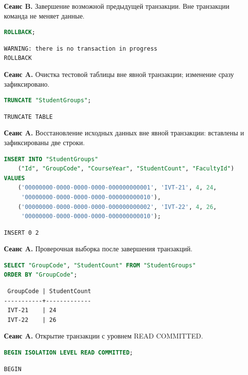 \documentclass[12pt,a4paper]{article}
\begin{document}
\textbf{Сеанс B.} Завершение возможной предыдущей транзакции. Вне транзакции команда не меняет данные.
\begin{lstlisting}[language=SQL]
ROLLBACK;
\end{lstlisting}

\begin{lstlisting}
WARNING: there is no transaction in progress
ROLLBACK
\end{lstlisting}

\textbf{Сеанс A.} Очистка тестовой таблицы вне явной транзакции; изменение сразу зафиксировано.
\begin{lstlisting}[language=SQL]
TRUNCATE "StudentGroups";
\end{lstlisting}

\begin{lstlisting}
TRUNCATE TABLE
\end{lstlisting}

\textbf{Сеанс A.} Восстановление исходных данных вне явной транзакции: вставлены и зафиксированы две строки.
\begin{lstlisting}[language=SQL]
INSERT INTO "StudentGroups"
    ("Id", "GroupCode", "CourseYear", "StudentCount", "FacultyId")
VALUES
    ('00000000-0000-0000-0000-000000000001', 'IVT-21', 4, 24,
     '00000000-0000-0000-0000-000000000010'),
    ('00000000-0000-0000-0000-000000000002', 'IVT-22', 4, 26,
     '00000000-0000-0000-0000-000000000010');
\end{lstlisting}

\begin{lstlisting}
INSERT 0 2
\end{lstlisting}

\textbf{Сеанс A.} Проверочная выборка после завершения транзакций.
\begin{lstlisting}[language=SQL]
SELECT "GroupCode", "StudentCount" FROM "StudentGroups"
ORDER BY "GroupCode";
\end{lstlisting}

\begin{lstlisting}
 GroupCode | StudentCount
-----------+-------------
 IVT-21    | 24
 IVT-22    | 26
\end{lstlisting}

\textbf{Сеанс A.} Открытие транзакции с уровнем READ COMMITTED.
\begin{lstlisting}[language=SQL]
BEGIN ISOLATION LEVEL READ COMMITTED;
\end{lstlisting}

\begin{lstlisting}
BEGIN
\end{lstlisting}
\end{document}
